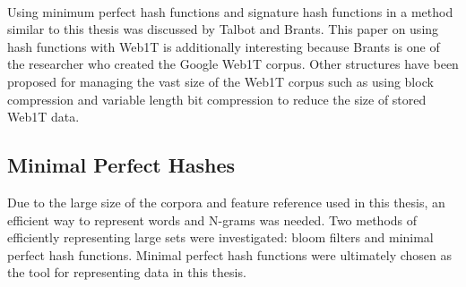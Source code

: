 	\paragraph{} Using minimum perfect hash functions and signature hash functions in a method similar to this thesis was discussed by Talbot and Brants. \cite{talbot_randomized_2008}  This paper on using hash functions with Web1T is additionally interesting because Brants is one of the researcher who created the Google Web1T corpus.  Other structures have been proposed for managing the vast size of the Web1T corpus such as using block compression and variable length bit compression to reduce the size of stored Web1T data.\cite{watanabe_succinct_2009}

	\subsection{Minimal Perfect Hashes} Due to the large size of the corpora and feature reference used in this thesis, an efficient way to represent words and N-grams was needed.  Two methods of efficiently representing large sets were investigated: bloom filters and minimal perfect hash functions.  Minimal perfect hash functions were ultimately chosen as the tool for representing data in this thesis.


